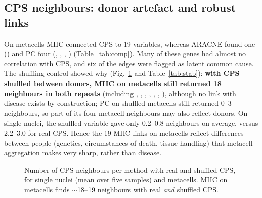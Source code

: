 \subsection{CPS neighbours: donor artefact and robust links}
On metacells MIIC connected CPS to 19 variables, whereas ARACNE found one () and PC four (, , , ) (Table~\ref{tab:comp}). Many of these genes had almost no correlation with CPS, and six of the edges were flagged as latent common cause. The shuffling control showed why (Fig.~\ref{fig:cps} and Table~\ref{tab:stab}): \textbf{with CPS shuffled between donors, MIIC on metacells still returned 18 neighbours in both repeats} (including , , , , , , ), although no link with disease exists by construction; PC on shuffled metacells still returned 0--3 neighbours, so part of its four metacell neighbours may also reflect donors. On single nuclei, the shuffled variable gave only 0.2--0.8 neighbours on average, versus 2.2--3.0 for real CPS. Hence the 19 MIIC links on metacells reflect differences between people (genetics, circumstances of death, tissue handling) that metacell aggregation makes very sharp, rather than disease.

\begin{figure}[ht]
\centering
{}
\caption{Number of CPS neighbours per method with real and shuffled CPS, for single nuclei (mean over five samples) and metacells. MIIC on metacells finds $\sim$18--19 neighbours with real \emph{and} shuffled CPS.\pcnote{}}\label{fig:cps}
\end{figure}

